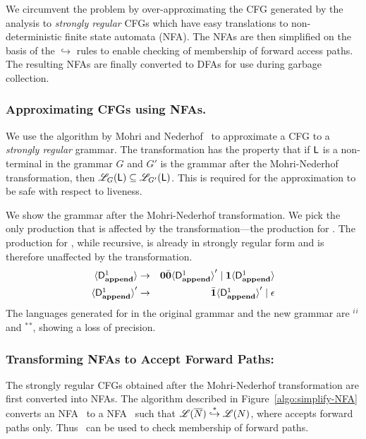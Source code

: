 \documentclass[9pt]{sigplanconf}
\newcommand{\comment}[1]{{\color{Myblue}{(#1)}}}
\begin{document}
\begin{enumerate}
  We circumvent the problem by over-approximating the CFG generated by the analysis to  {\em
  strongly  regular}  CFGs which  have   easy
translations to non-deterministic finite state automata (NFA). The
NFAs are then simplified on the
basis  of  the  $\hookrightarrow$  rules to  enable  checking  of
membership of forward access paths. The resulting NFAs are   finally
converted to DFAs for use during garbage collection.
\comment{Fix all comments and produce first draft}
\subsubsection{Approximating CFGs using NFAs.}
\label{sec:NFA-approx}
\comment{Change the language and the example}
We use the   
algorithm  by  Mohri  and Nederhof~\cite{mohri00regular}   to
approximate a CFG  to a   {\em strongly regular\/} grammar.  The
transformation has  the  property that  if $\mathsf{L}$  is a
non-terminal  in the grammar  $G$ and  $G'$ is  the grammar  after the
Mohri-Nederhof transformation, then  ${\mathscr L}_G(\mathsf{L}) \subseteq {\mathscr
  L}_{G'}(\mathsf{L})$.    This  is   required  for the
approximation to be safe with respect to liveness.

We show the  grammar after the Mohri-Nederhof
transformation. We  pick the only production that  is affected by
the transformation---the production for .  The
production for , while  recursive, is already in
strongly  regular  form  and   is  therefore  unaffected  by  the
transformation.
 \begin{eqnarray*}
  \var{\Df{\append}{1}}
  &\rightarrow&               \acar\bcar \var{\Df{\append}{1}}'  \mid
  \acdr\var{\Df{\append}{1}} \\ 
\var{\Df{\append}{1}}'  &\rightarrow&   \bcdr\var{\Df{\append}{1}}'
\mid \epsilon 
\end{eqnarray*}
The  languages
generated for   in  the original grammar  and the
new       grammar      are       \acdr$^i$\acar\bcar\bcdr$^i$      and
\acdr$^*$\acar\bcar\bcdr$^*$, showing a  loss of  precision.
 


\subsubsection{Transforming NFAs to Accept Forward Paths:}
The strongly regular CFGs obtained after the Mohri-Nederhof
transformation are
  first converted  into  NFAs.  The        algorithm         described        in
Figure~\ref{algo:simplify-NFA} converts  an NFA \ntbar\  to a NFA
\nt\ such that  $\mathscr{L}({\overline{N}}) \stackrel{*}{\hookrightarrow}
\mathscr{L}({N})$, where {\nt} accepts forward paths only.
\comment{Rewrite the algorithm to handle \cbar and update the example automata}
Thus  \nt\  can  be  used  to  check  
membership of forward paths.


\end{enumerate}
\end{document}
